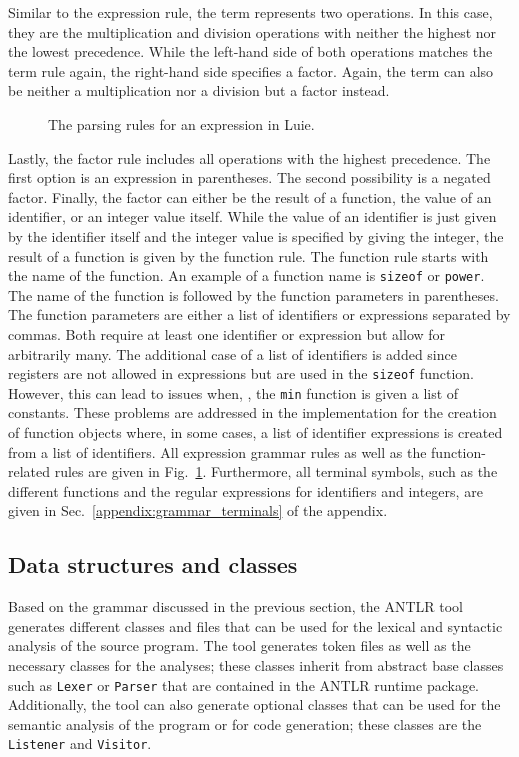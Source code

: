 Similar to the expression rule, the term represents two operations. In this case, they are the multiplication and division operations with neither the highest nor the lowest precedence. While the left-hand side of both operations matches the term rule again, the right-hand side specifies a factor. Again, the term can also be neither a multiplication nor a division but a factor instead.

\begin{figure}[htp]
    \centering
    
    \caption{The parsing rules for an expression in Luie.}
    \label{fig:implementation_expression}
\end{figure}

Lastly, the factor rule includes all operations with the highest precedence. The first option is an expression in parentheses. 
The second possibility is a negated factor. Finally, the factor can either be the result of a function, the value of an identifier, or an integer value itself. While the value of an identifier is just given by the identifier itself and the integer value is specified by giving the integer, the result of a function is given by the function rule. The function rule starts with the name of the function. An example of a function name is \texttt{sizeof} or \texttt{power}. The name of the function is followed by the function parameters in parentheses. The function parameters are either a list of identifiers or expressions separated by commas. Both require at least one identifier or expression but allow for arbitrarily many.
The additional case of a list of identifiers is added since registers are not allowed in expressions but are used in the \texttt{sizeof} function. However, this can lead to issues when, \eg, the \texttt{min} function is given a list of constants. These problems are addressed in the implementation for the creation of function objects where, in some cases, a list of identifier expressions is created from a list of identifiers.
All expression grammar rules as well as the function-related rules are given in Fig.~\ref{fig:implementation_expression}. Furthermore, all terminal symbols, such as the different functions and the regular expressions for identifiers and integers, are given in Sec.~\ref{appendix:grammar_terminals} of the appendix.

\subsection{Data structures and classes}
\label{sec:implementation_syntax_dataStructuresClasses}
Based on the grammar discussed in the previous section, the ANTLR tool generates different classes and files that can be used for the lexical and syntactic analysis of the source program. The tool generates token files as well as the necessary classes for the analyses; these classes inherit from abstract base classes such as \texttt{Lexer} or \texttt{Parser} that are contained in the ANTLR runtime package. Additionally, the tool can also generate optional classes that can be used for the semantic analysis of the program or for code generation; these classes are the \texttt{Listener} and \texttt{Visitor}.

